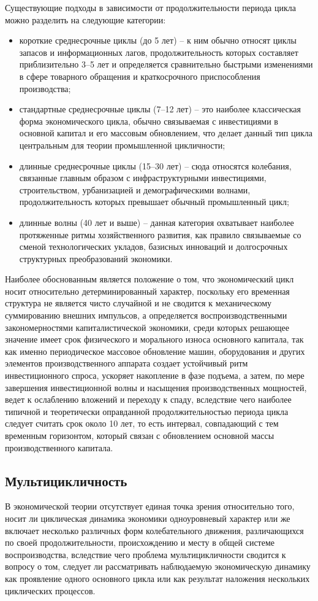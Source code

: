 Существующие подходы в зависимости от продолжительности периода цикла можно разделить на следующие категории:
\begin{itemize}
    \item короткие среднесрочные циклы (до 5 лет) – к ним обычно относят циклы запасов и информационных лагов, продолжительность которых составляет приблизительно 3–5 лет и определяется сравнительно быстрыми изменениями в сфере товарного обращения и краткосрочного приспособления производства;
    \item стандартные среднесрочные циклы (7–12 лет) – это наиболее классическая форма экономического цикла, обычно связываемая с инвестициями в основной капитал и его массовым обновлением, что делает данный тип цикла центральным для теории промышленной цикличности;
    \item длинные среднесрочные циклы (15–30 лет) – сюда относятся колебания, связанные главным образом с инфраструктурными инвестициями, строительством, урбанизацией и демографическими волнами, продолжительность которых превышает обычный промышленный цикл;
    \item длинные волны (40 лет и выше) – данная категория охватывает наиболее протяженные ритмы хозяйственного развития, как правило связываемые со сменой технологических укладов, базисных инноваций и долгосрочных структурных преобразований экономики.
\end{itemize}

Наиболее обоснованным является положение о том, что экономический цикл носит относительно детерминированный характер, поскольку его временная структура не является чисто случайной и не сводится к механическому суммированию внешних импульсов, а определяется воспроизводственными закономерностями капиталистической экономики, среди которых решающее значение имеет срок физического и морального износа основного капитала, так как именно периодическое массовое обновление машин, оборудования и других элементов производственного аппарата создает устойчивый ритм инвестиционного спроса, ускоряет накопление в фазе подъема, а затем, по мере завершения инвестиционной волны и насыщения производственных мощностей, ведет к ослаблению вложений и переходу к спаду, вследствие чего наиболее типичной и теоретически оправданной продолжительностью периода цикла следует считать срок около 10 лет, то есть интервал, совпадающий с тем временным горизонтом, который связан с обновлением основной массы производственного капитала.

\subsection{Мультицикличность} %
В экономической теории отсутствует единая точка зрения относительно того, носит ли циклическая динамика экономики одноуровневый характер или же включает несколько различных форм колебательного движения, различающихся по своей продолжительности, происхождению и месту в общей системе воспроизводства, вследствие чего проблема мультицикличности сводится к вопросу о том, следует ли рассматривать наблюдаемую экономическую динамику как проявление одного основного цикла или как результат наложения нескольких циклических процессов.

